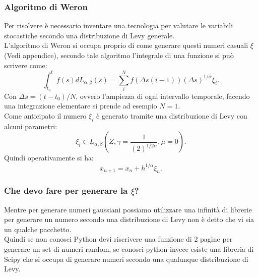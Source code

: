 \subsubsection{Algoritmo di Weron}%
\label{subsub:Algoritmo di Weron}
Per risolvere è necessario inventare una tecnologia per valutare le variabili stocastiche secondo una distribuzione di Levy generale. \\
L'algoritmo di Weron si occupa proprio di come generare questi numeri casuali $\xi$ (Vedi appendice), secondo tale algoritmo l'integrale di una funzione si può scrivere come:
\[
    \int_{t_0}^{t} f(s) dL_{\alpha,\beta  }(s) = \sum_{i}^{N} f(\Delta s(i-1)) \left(\Delta s\right)^{1 /\alpha}\xi_i
.\] 
Con $\Delta s = (t-t_0) /N$, ovvero l'ampiezza di ogni intervallo temporale, facendo una integrazione elementare si prende ad esempio $N=1$.\\
Come anticipato il numero $\xi_i$ è generato tramite una distribuzione di Levy con alcuni parametri:
\[
    \xi_i \in L_{\alpha,\beta  }\left(Z,\gamma =\frac{1}{\left(2\right)^{1 /2\alpha}}, \mu =0\right)
.\] 
Quindi operativamente si ha:
\[
    x_{n+1} = x_n + h ^{1 /\alpha}\xi_n
.\] 
\subsubsection{Che devo fare per generare la $\xi$?}%
Mentre per generare numeri gaussiani possiamo utilizzare una infinità di librerie per generare un numero secondo una distribuzione di Levy non è detto che vi sia un qualche pacchetto. \\
Quindi se non conosci Python devi riscrivere una funzione di 2 pagine per generare un set di numeri random, se conosci python invece esiste una libreria di Scipy che si occupa di generare numeri secondo una qualunque distribuzione di Levy.
\clearpage
